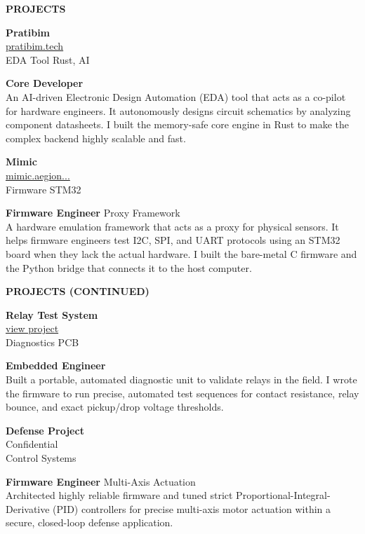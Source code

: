 \documentclass[10pt,a4paper]{article}
\makeatletter
\newcommand{\cvsectionstandard}[1]{
    \vspace{1.5em}
    \noindent
    \textbf{\uppercase{#1}} \hspace{0.8em} {\color{linegray}\hrulefill}
    \vspace{0.8em}
}
\newcommand{\cventry}[6]{
    \noindent
    \begin{minipage}[t]{0.22\textwidth}
        \raggedright
        \textbf{#1} \\[0.4em]
        \textcolor{textgray}{\scriptsize #2} \\[0.2em]
        \textcolor{textgray}{\scriptsize #3}
    \end{minipage}%
    \begin{minipage}[t]{0.04\textwidth}
        \centering \vspace{0.2em} \textcolor{linegray}{\textbullet}
    \end{minipage}%
    \begin{minipage}[t]{0.74\textwidth}
        \raggedright
        \textbf{#4} #5 \\[0.4em]
        \small #6
    \end{minipage}
    \par\vspace{1.2em}
}
\newcommand{\cvfooter}{
    \vfill
    \begin{center}
        \colorbox{lightgray}{
            \makebox[\dimexpr\textwidth-2\fboxsep\relax]{
                \vspace{0.4em}
                \small \textcolor{textblack}{
                    \faPhone \hspace{0.3em} +91 6281858488 \quad \textbar \quad 
                    \faEnvelope \hspace{0.3em} karthiks1mail@gmail.com
                }
                \vspace{0.4em}
            }
        }
    \end{center}
}
\makeatother
\begin{document}
\cvsectionstandard{Projects}

\cventry{Pratibim}{\href{https://pratibim.tech}{\textcolor{linkblue}{\faExternalLinkAlt \hspace{0.1em} pratibim.tech}}}{EDA Tool \textbar{} Rust, AI}{Core Developer}{}{
    An AI-driven Electronic Design Automation (EDA) tool that acts as a co-pilot for hardware engineers. It autonomously designs circuit schematics by analyzing component datasheets. I built the memory-safe core engine in Rust to make the complex backend highly scalable and fast.
}

\cventry{Mimic}{\href{https://mimic.aegiondynamic.com}{\textcolor{linkblue}{\faExternalLinkAlt \hspace{0.1em} mimic.aegion...}}}{Firmware \textbar{} STM32}{Firmware Engineer}{\textbar{} Proxy Framework}{
    A hardware emulation framework that acts as a proxy for physical sensors. It helps firmware engineers test I2C, SPI, and UART protocols using an STM32 board when they lack the actual hardware. I built the bare-metal C firmware and the Python bridge that connects it to the host computer.
}

\cvfooter
\newpage

\vspace*{0.5em} %
\cvsectionstandard{Projects (Continued)}

\cventry{Relay Test System}{\href{https://github.com/Karthik-Sarvan}{\textcolor{linkblue}{\faExternalLinkAlt \hspace{0.1em} view project}}}{Diagnostics \textbar{} PCB}{Embedded Engineer}{}{
    Built a portable, automated diagnostic unit to validate relays in the field. I wrote the firmware to run precise, automated test sequences for contact resistance, relay bounce, and exact pickup/drop voltage thresholds.
}

\cventry{Defense Project}{\textcolor{textgray}{\faLock \hspace{0.1em} Confidential}}{Control Systems}{Firmware Engineer}{\textbar{} Multi-Axis Actuation}{
    Architected highly reliable firmware and tuned strict Proportional-Integral-Derivative (PID) controllers for precise multi-axis motor actuation within a secure, closed-loop defense application.
}
\end{document}
